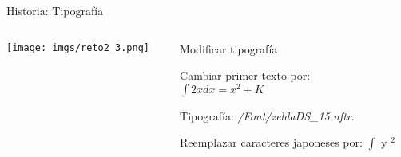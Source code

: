 \begin{frame}{Historia: Tipografía}
    \begin{columns}
    \begin{column}{0.3\textwidth}
        \texttt{[image: imgs/reto2\_3.png]}
    \end{column}
    \begin{column}{0.7\textwidth}
        Modificar tipografía
        \footnotesize
        \begin{wideitemize}
            \item Cambiar primer texto por:\\
                  $\int2x dx=x^2+K$
            \item Tipografía: \textit{/Font/zeldaDS\_15.nftr}.
            \item Reemplazar caracteres japoneses por: $\int$ y $^2$
        \end{wideitemize}
    \end{column}
    \end{columns}
\end{frame}
